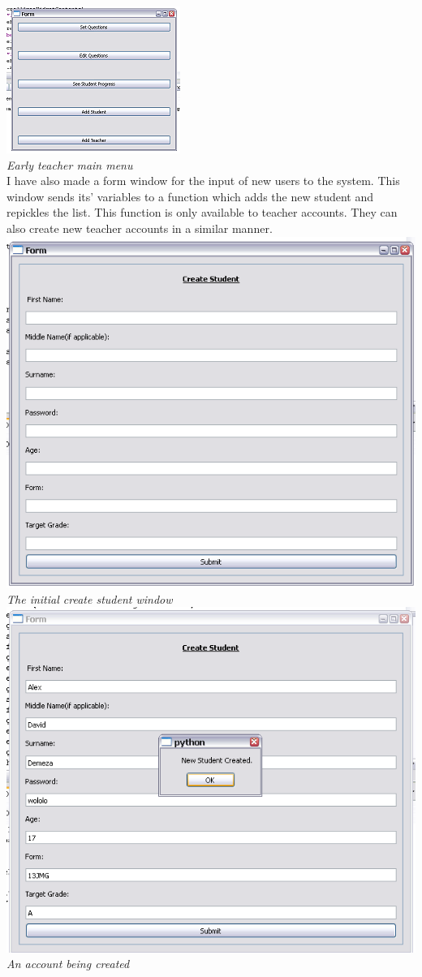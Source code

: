 \documentclass[a4paper,12pt]{report}
\begin{document}
\includegraphics{MainMenuOld}\label{Old Main Menu}\\
\emph{Early teacher main menu}\\
\bigskip
I have also made a form window for the input of new users to the system. This window sends its' variables to a function which adds the new student and repickles the list. This function is only available to teacher accounts. They can also create new teacher accounts in a similar manner.
\includegraphics{CreateStudent}\\
\emph{The initial create student window}\\
\includegraphics{CreateStudent2}\\
\emph{An account being created}\\
\end{document}
